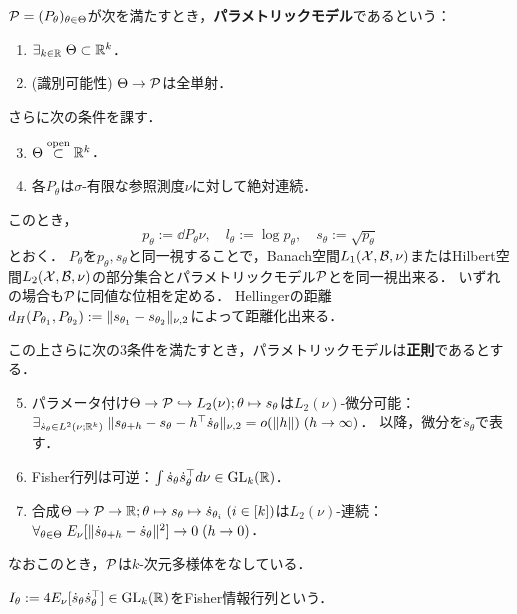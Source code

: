 \documentclass[uplatex,dvipdfmx]{jsreport}
\begin{document}
\begin{definition}
    $\P=(P_\theta)_{\theta\in\Theta}$が次を満たすとき，\textbf{パラメトリックモデル}であるという：
    \begin{enumerate}
        \item $\exists_{k\in\R}\;\Theta\subset\R^k$．
        \item (識別可能性) $\Theta\to\P$は全単射．
    \end{enumerate}
    さらに次の条件を課す．
    \begin{enumerate}\setcounter{enumi}{2}
        \item $\Theta\osub\R^k$．
        \item 各$P_\theta$は$\sigma$-有限な参照測度$\nu$に対して絶対連続．
    \end{enumerate}
    このとき，
    \[p_\theta:=\dd{P_\theta}{\nu},\quad l_\theta:=\log p_\theta,\quad s_\theta:=\sqrt{p_\theta}\]
    とおく．
    $P_\theta$を$p_\theta,s_\theta$と同一視することで，Banach空間$L_1(\X,\B,\nu)$またはHilbert空間$L_2(\X,\B,\nu)$の部分集合とパラメトリックモデル$\P$とを同一視出来る．
    いずれの場合も$\P$に同値な位相を定める．
    Hellingerの距離$d_H(P_{\theta_1},P_{\theta_2}):=\norm{s_{\theta_1}-s_{\theta_2}}_{\nu,2}$によって距離化出来る．
    
    この上さらに次の3条件を満たすとき，パラメトリックモデルは\textbf{正則}であるとする．
    \begin{enumerate}\setcounter{enumi}{4}
        \item パラメータ付け$\Theta\to\P\mono L_2(\nu);\theta\mapsto s_\theta$は$L_2(\nu)$-微分可能：$\exists_{\dot{s}_\theta\in L^2(\nu;\R^k)}\;\norm{s_{\theta+h}-s_\theta-h^\top\dot{s}_\theta}_{\nu,2}=o(\norm{h})\;(h\to\infty)$．
        以降，微分を$\dot{s}_\theta$で表す．
        \item Fisher行列は可逆：$\int\dot{s}_\theta\dot{s}_\theta^\top d\nu\in\GL_k(\R)$．
        \item 合成$\Theta\to\P\to\R;\theta\mapsto s_\theta\mapsto \dot{s}_{\theta_i}\;(i\in[k])$は$L_2(\nu)$-連続：$\forall_{\theta\in\Theta}\;E_\nu[\norm{\dot{s}_{\theta+h}-\dot{s}_\theta}^2]\to0\;(h\to0)$．
    \end{enumerate}
    なおこのとき，$\P$は$k$-次元多様体をなしている．
\end{definition}

\begin{definition}
    $I_\theta:=4E_\nu[\dot{s}_\theta\dot{s}_\theta^\top]\in\GL_k(\R)$をFisher情報行列という．
\end{definition}
\end{document}
